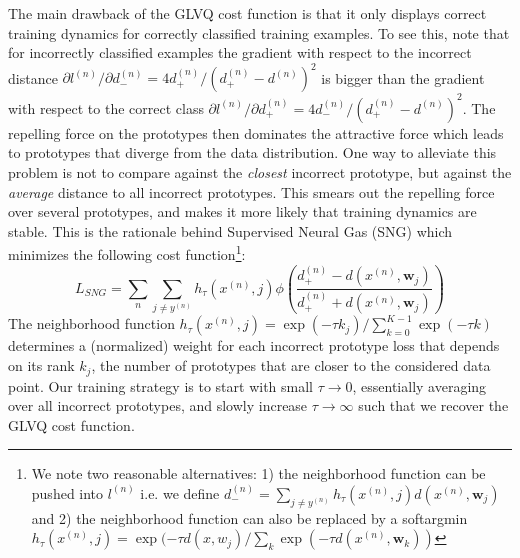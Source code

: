 \documentclass{esannV2}
\begin{document}
The main drawback of the GLVQ cost function is that it only displays correct training dynamics for correctly classified training examples\cite{sato1996generalized}.  
To see this, note that for incorrectly classified examples the gradient with respect to the incorrect distance $\partial l^{(n)} / \partial d^{(n)}_- = 4d^{(n)}_+/(d^{(n)}_+ - d^{(n)})^2$ is bigger than the gradient with respect to the correct class $\partial l^{(n)} / \partial d^{(n)}_+ = 4d^{(n)}_-/(d^{(n)}_+ - d^{(n)})^2$. The repelling force on the prototypes then dominates the attractive force which leads to prototypes that diverge from the data distribution. One way to alleviate this problem is not to compare against the \emph{closest} incorrect prototype, but against the \emph{average} distance to all incorrect prototypes. This smears out the repelling force over several prototypes, and makes it more likely that training dynamics are stable.  This is the rationale behind Supervised Neural Gas (SNG) \cite{SNG} which minimizes the following cost function\footnote{We note two reasonable alternatives: 1) the neighborhood function can be pushed into $l^{(n)}$ i.e. we define $d^{(n)}_- = \sum_{j \neq y^{(n)}} h_\tau(x^{(n)}, j) d(x^{(n)}, \mathbf{w}_j)$ and 2) the neighborhood function can also be replaced by a softargmin $h_\tau(x^{(n)}, j) = \exp(-\tau d(x, w_j)/\sum_k \exp(-\tau d(x^{(n)}, \mathbf{w}_k))$}:
\begin{equation}
 L_{SNG} = \sum_n \sum_{j\neq y^{(n)}} h_\tau(x^{(n)}, j) \phi\left(\frac{d^{(n)}_+ - d(x^{(n)}, \mathbf{w}_j)}{d^{(n)}_+ + d(x^{(n)}, \mathbf{w}_j)}\right)
\end{equation}
The neighborhood function $h_\tau(x^{(n)}, j) = \exp(-\tau k_j)/ \sum_{k=0}^{K-1} \exp(-\tau k)$ determines a (normalized) weight for each incorrect prototype loss that depends on its rank $k_j$, the number of prototypes that are closer to the considered data point. Our training strategy is to start with small $\tau \rightarrow 0$, essentially averaging over all incorrect prototypes, and slowly increase $\tau \rightarrow \infty$ such that we recover the GLVQ cost function. 
\end{document}
